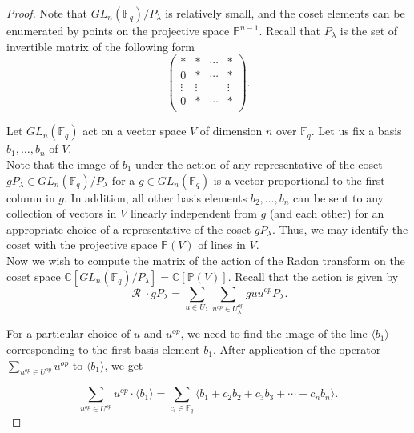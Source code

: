 \documentclass[12pt,reqno]{amsart}
\theoremstyle{definition}
\theoremstyle{remark}
\numberwithin{equation}{section}
\newcommand{\CC}{\mathbb{C}}
\newcommand{\GL}[1]{GL_{#1}(\mathbb{F}_q)}
\DeclareMathOperator{\R}{\mathcal{R}}
\begin{document}
\begin{proof}
    Note that $GL_n(\mathbb{F}_q) / P_\lambda$ is relatively small, and the coset elements can be enumerated by points on the projective space $\mathbb{P}^{n-1}$. Recall that $P_\lambda$ is the set of invertible matrix of the following form
    \begin{equation*}
        \begin{pmatrix}
            * & * & \cdots & * \\
            0 & * & \cdots & *\\
            \vdots & \vdots & & \vdots \\
            0 & * & \cdots & *\\
        \end{pmatrix}.
    \end{equation*}

    Let $GL_n(\mathbb{F}_q)$ act on a vector space $V$ of dimension $n$ over $\mathbb{F}_q$. Let us fix a basis $b_1, \dots, b_n$ of $V$.\\

    Note that the image of $b_1$ under the action of any representative of the coset $gP_\lambda\in \GL{n}/P_{\lambda}$ for a $g \in \GL{n}$ is a vector proportional to the first column in $g$. In addition, all other basis elements $b_2,\dots,b_n$ can be sent to any collection of vectors in $V$ linearly independent from $g$ (and each other) for an appropriate choice of a representative of the coset $gP_\lambda$. Thus, we may identify the coset with the projective space $\mathbb{P}(V)$ of lines in $V$.\\

    Now we wish to compute the matrix of the action of the Radon transform on the coset space $\CC[\GL{n}/P_{\lambda}]=\CC[\mathbb{P}(V)]$. Recall that the action is given by
    \begin{equation}\label{example_mirabolic}
        \R \cdot gP_{\lambda}= \sum_{u \in U_\lambda}\sum_{u^{op} \in U_\lambda^{op}}g u  u^{op} P_\lambda.
    \end{equation}

    For a particular choice of $u$ and $u^{op}$, we need to find the image of the line $\langle b_1 \rangle$ corresponding to the first basis element $b_1$. %
    After application of the operator $\sum_{u^{op} \in U^{op}}u^{op}$ to $\langle b_1 \rangle$, we get
    
    \begin{equation*}
        \sum_{u^{op} \in U^{op}}u^{op} \cdot \langle b_1 \rangle=\sum_{c_i \in \mathbb{F}_q}\langle b_1 + c_2 b_2 + c_3 b_3 + \cdots + c_n b_n\rangle.
    \end{equation*}


\end{proof}
\end{document}
